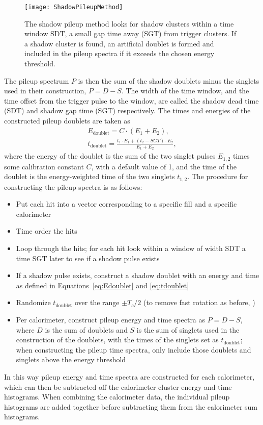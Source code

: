 \begin{figure}
    \centering
    \texttt{[image: ShadowPileupMethod]}
    \caption[Shadow pileup method]{The shadow pileup method looks for shadow clusters within a time window SDT, a small gap time away (SGT) from trigger clusters. If a shadow cluster is found, an artificial doublet is formed and included in the pileup spectra if it exceeds the chosen energy threshold.}
    \label{fig:ShadowPileupMethod}
\end{figure}

The pileup spectrum $P$ is then the sum of the shadow doublets minus the singlets used in their construction, $P = D - S$. The width of the time window, and the time offset from the trigger pulse to the window, are called the shadow dead time (SDT) and shadow gap time (SGT) respectively. The times and energies of the constructed pileup doublets are taken as
            \begin{gather}
                E_{\text{doublet}} = C \cdot (E_{1} + E_{2}), \label{eq:Edoublet} \\
                t_{\text{doublet}} = \frac{t_{1} \cdot E_{1} + (t_{2}-SGT) \cdot E_{2}}{E_{1} + E_{2}}, \label{eq:tdoublet}
            \end{gather}
where the energy of the doublet is the sum of the two singlet pulses $E_{1,2}$ times some calibration constant $C$, with a default value of 1, and the time of the doublet is the energy-weighted time of the two singlets $t_{1,2}$. The procedure for constructing the pileup spectra is as follows:
\begin{itemize}
    \item{Put each hit into a vector corresponding to a specific fill and a specific calorimeter}
    \item{Time order the hits}
    \item{Loop through the hits; for each hit look within a window of width SDT a time SGT later to see if a shadow pulse exists}
    \item{If a shadow pulse exists, construct a shadow doublet with an energy and time as defined in Equations~\ref{eq:Edoublet} and \ref{eq:tdoublet}}
    \item{Randomize $t_{\text{doublet}}$ over the range $\pm T_{c}/2$ (to remove fast rotation as before, )}
    \item{Per calorimeter, construct pileup energy and time spectra as $P = D - S$, where $D$ is the sum of doublets and $S$ is the sum of singlets used in the construction of the doublets, with the times of the singlets set as $t_{\text{doublet}}$; when constructing the pileup time spectra, only include those doublets and singlets above the energy threshold}
\end{itemize}
In this way pileup energy and time spectra are constructed for each calorimeter, which can then be subtracted off the calorimeter cluster energy and time histograms. When combining the calorimeter data, the individual pileup histograms are added together before subtracting them from the calorimeter sum histograms.



